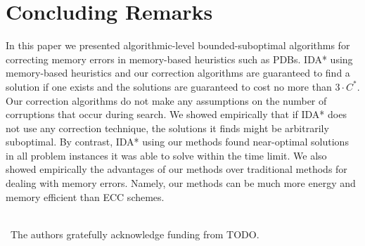 \documentclass[letterpaper]{article}
\begin{document}

\vspace{-0.15cm}
\section{Concluding Remarks}

In this paper we presented algorithmic-level bounded-suboptimal algorithms for correcting memory errors in memory-based heuristics such as PDBs. %
IDA* using memory-based heuristics and our correction algorithms are guaranteed to find a solution if one exists and the solutions are guaranteed to cost no more than $3 \cdot C^*$. Our correction algorithms do not make any assumptions on the number of corruptions that occur during search. We showed empirically that if IDA* does not use any correction technique, the solutions it finds might be arbitrarily suboptimal. %
By contrast, IDA* using our methods found near-optimal solutions in all problem instances it was able to solve within the time limit. We also showed empirically the advantages of our methods over traditional methods for dealing with memory errors. Namely, our methods can be much more energy and memory efficient than ECC schemes. 

~~\\
~The authors gratefully acknowledge funding from TODO. 




\end{document}
